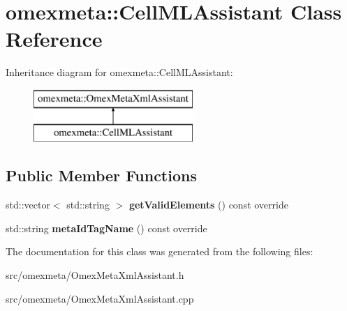 \hypertarget{classomexmeta_1_1CellMLAssistant}{}\section{omexmeta\+:\+:Cell\+M\+L\+Assistant Class Reference}
\label{classomexmeta_1_1CellMLAssistant}
Inheritance diagram for omexmeta\+:\+:Cell\+M\+L\+Assistant\+:\begin{figure}[H]
\begin{center}
\leavevmode
\includegraphics[height=2.000000cm]{classomexmeta_1_1CellMLAssistant}
\end{center}
\end{figure}
\subsection*{Public Member Functions}
\begin{DoxyCompactItemize}
\item 
\mbox{\label{classomexmeta_1_1CellMLAssistant_ad0fa4e23c94197d5682a0f8e1dec0889}} 
std\+::vector$<$ std\+::string $>$ {\bfseries get\+Valid\+Elements} () const override
\item 
\mbox{\label{classomexmeta_1_1CellMLAssistant_a4aaccf21ed47201abaf20d67ad7bfaab}} 
std\+::string {\bfseries meta\+Id\+Tag\+Name} () const override
\end{DoxyCompactItemize}


The documentation for this class was generated from the following files\+:\begin{DoxyCompactItemize}
\item 
src/omexmeta/Omex\+Meta\+Xml\+Assistant.\+h\item 
src/omexmeta/Omex\+Meta\+Xml\+Assistant.\+cpp\end{DoxyCompactItemize}
